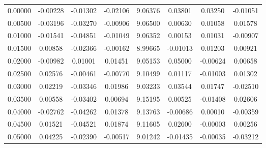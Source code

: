 \documentclass[]{article}
\begin{document}
\begin{table}[ht]
\begin{center}
\begin{tabular}{cccccccc}
			\footnotesize 0.00000 & \footnotesize -0.00228 & \footnotesize -0.01302 & \footnotesize -0.02106 & \footnotesize 9.06376 & \footnotesize 0.03801 & \footnotesize 0.03250 & \footnotesize -0.01051 \\
			\footnotesize 0.00500 & \footnotesize -0.03196 & \footnotesize -0.03270 & \footnotesize -0.00906 & \footnotesize 9.06500 & \footnotesize 0.00630 & \footnotesize 0.01058 & \footnotesize 0.01578 \\
			\footnotesize 0.01000 & \footnotesize -0.01541 & \footnotesize -0.04851 & \footnotesize -0.01049 & \footnotesize 9.06352 & \footnotesize 0.00153 & \footnotesize 0.01031 & \footnotesize -0.00907 \\
			\footnotesize 0.01500 & \footnotesize 0.00858 & \footnotesize -0.02366 & \footnotesize -0.00162 & \footnotesize 8.99665 & \footnotesize -0.01013 & \footnotesize 0.01203 & \footnotesize 0.00921 \\
			\footnotesize 0.02000 & \footnotesize -0.00982 & \footnotesize 0.01001 & \footnotesize 0.01451 & \footnotesize 9.05153 & \footnotesize 0.05000 & \footnotesize -0.00624 & \footnotesize 0.00658 \\
			\footnotesize 0.02500 & \footnotesize 0.02576 & \footnotesize -0.00461 & \footnotesize -0.00770 & \footnotesize 9.10499 & \footnotesize 0.01117 & \footnotesize -0.01003 & \footnotesize 0.01302 \\
			\footnotesize 0.03000 & \footnotesize 0.02219 & \footnotesize -0.03346 & \footnotesize 0.01986 & \footnotesize 9.03233 & \footnotesize 0.03544 & \footnotesize 0.01747 & \footnotesize -0.02510 \\
			\footnotesize 0.03500 & \footnotesize 0.00558 & \footnotesize -0.03402 & \footnotesize 0.00694 & \footnotesize 9.15195 & \footnotesize 0.00525 & \footnotesize -0.01408 & \footnotesize 0.02606 \\
			\footnotesize 0.04000 & \footnotesize -0.02762 & \footnotesize -0.04262 & \footnotesize 0.01378 & \footnotesize 9.13763 & \footnotesize -0.00686 & \footnotesize 0.00010 & \footnotesize -0.00359 \\
			\footnotesize 0.04500 & \footnotesize 0.01521 & \footnotesize -0.04521 & \footnotesize 0.01874 & \footnotesize 9.11605 & \footnotesize 0.02600 & \footnotesize -0.00003 & \footnotesize 0.00256 \\
			\footnotesize 0.05000 & \footnotesize 0.04225 & \footnotesize -0.02390 & \footnotesize -0.00517 & \footnotesize 9.01242 & \footnotesize -0.01435 & \footnotesize -0.00035 & \footnotesize -0.03212 \\

\end{tabular}
\end{center}
\end{table}
\end{document}
